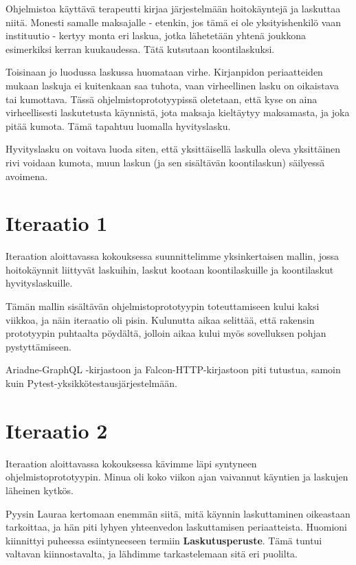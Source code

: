 Ohjelmistoa käyttävä terapeutti kirjaa järjestelmään hoitokäyntejä ja
laskuttaa niitä. Monesti samalle maksajalle - etenkin, jos tämä ei ole
yksityishenkilö vaan instituutio - kertyy monta eri laskua, jotka
lähetetään yhtenä joukkona esimerkiksi kerran kuukaudessa. Tätä
kutsutaan koontilaskuksi.

Toisinaan jo luodussa laskussa huomataan virhe. Kirjanpidon
periaatteiden mukaan laskuja ei kuitenkaan saa tuhota, vaan virheellinen
lasku on oikaistava tai kumottava. Tässä ohjelmistoprototyypissä
oletetaan, että kyse on aina virheellisesti laskutetusta käynnistä, jota
maksaja kieltäytyy maksamasta, ja joka pitää kumota. Tämä tapahtuu
luomalla hyvityslasku.

Hyvityslasku on voitava luoda siten, että yksittäisellä laskulla oleva
yksittäinen rivi voidaan kumota, muun laskun (ja sen sisältävän
koontilaskun) säilyessä avoimena.

\hypertarget{iteraatio-1}{%
\section{Iteraatio 1}\label{iteraatio-1}}

Iteraation aloittavassa kokouksessa suunnittelimme yksinkertaisen
mallin, jossa hoitokäynnit liittyvät laskuihin, laskut kootaan
koontilaskuille ja koontilaskut hyvityslaskuille.

Tämän mallin sisältävän ohjelmistoprototyypin toteuttamiseen kului kaksi
viikkoa, ja näin iteraatio oli pisin. Kulunutta aikaa selittää, että
rakensin prototyypin puhtaalta pöydältä, jolloin aikaa kului myös
sovelluksen pohjan pystyttämiseen.

Ariadne-GraphQL -kirjastoon ja Falcon-HTTP-kirjastoon piti tutustua,
samoin kuin Pytest-yksikkötestausjärjestelmään.

\hypertarget{iteraatio-2}{%
\section{Iteraatio 2}\label{iteraatio-2}}

Iteraation aloittavassa kokouksessa kävimme läpi syntyneen
ohjelmistoprototyypin. Minua oli koko viikon ajan vaivannut käyntien ja
laskujen läheinen kytkös.

Pyysin Lauraa kertomaan enemmän siitä, mitä käynnin laskuttaminen
oikeastaan tarkoittaa, ja hän piti lyhyen yhteenvedon laskuttamisen
periaatteista. Huomioni kiinnittyi puheessa esiintyneeseen termiin
\textbf{Laskutusperuste}. Tämä tuntui valtavan kiinnostavalta, ja
lähdimme tarkastelemaan sitä eri puolilta.

